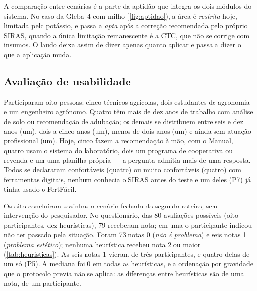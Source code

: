 A comparação entre cenários é a parte da aptidão que integra os dois módulos do sistema. No caso
da Gleba~4 com milho (\autoref{fig:aptidao}), a área é \emph{restrita} hoje, limitada pelo
potássio, e passa a \emph{apta} após a correção recomendada pelo próprio SIRAS, quando a única
limitação remanescente é a CTC, que não se corrige com insumos. O laudo deixa assim de dizer
apenas quanto aplicar e passa a dizer o que a aplicação muda.

\subsection{Avaliação de usabilidade}\label{sec:res_usabilidade}
Participaram oito pessoas: cinco técnicos agrícolas, dois estudantes de agronomia e um
engenheiro agrônomo. Quatro têm mais de dez anos de trabalho com análise de solo ou recomendação
de adubação; os demais se distribuem entre seis e dez anos (um), dois a cinco anos (um), menos de
dois anos (um) e ainda sem atuação profissional (um). Hoje, cinco fazem a recomendação à mão, com
o Manual, quatro usam o sistema do laboratório, dois um programa de cooperativa ou revenda e um
uma planilha própria --- a pergunta admitia mais de uma resposta. Todos se declararam
confortáveis (quatro) ou muito confortáveis (quatro) com ferramentas digitais, nenhum conhecia o
SIRAS antes do teste e um deles (P7) já tinha usado o FertFácil.

Os oito concluíram sozinhos o cenário fechado do segundo roteiro, sem intervenção do pesquisador.
No questionário, das 80 avaliações possíveis (oito participantes, dez heurísticas), 79 receberam
nota; em uma o participante indicou não ter passado pela situação. Foram 73 notas 0 (\emph{não é
problema}) e seis notas 1 (\emph{problema estético}); nenhuma heurística recebeu nota 2 ou maior
(\autoref{tab:heuristicas}). As seis notas 1 vieram de três participantes, e quatro delas de um só
(P5). A mediana foi 0 em todas as heurísticas, e a ordenação por gravidade que o protocolo previa
não se aplica: as diferenças entre heurísticas são de uma nota, de um participante.

